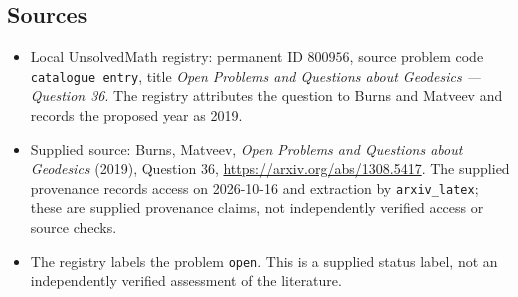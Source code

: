\documentclass[11pt]{article}
\begin{document}
\subsection{Sources}
\begin{itemize}
\item Local UnsolvedMath registry: permanent ID \(800956\), source problem code \texttt{catalogue entry}, title \emph{Open Problems and Questions about Geodesics --- Question 36}. The registry attributes the question to Burns and Matveev and records the proposed year as 2019.
\item Supplied source: Burns, Matveev, \emph{Open Problems and Questions about Geodesics} (2019), Question 36, \url{https://arxiv.org/abs/1308.5417}. The supplied provenance records access on 2026-10-16 and extraction by \texttt{arxiv\_latex}; these are supplied provenance claims, not independently verified access or source checks.
\item The registry labels the problem \texttt{open}. This is a supplied status label, not an independently verified assessment of the literature.
\end{itemize}
\end{document}
